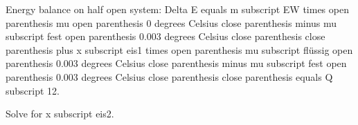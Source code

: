 Energy balance on half open system:  
Delta E equals m subscript EW times open parenthesis mu open parenthesis 0 degrees Celsius close parenthesis minus mu subscript fest open parenthesis 0.003 degrees Celsius close parenthesis close parenthesis plus x subscript eis1 times open parenthesis mu subscript flüssig open parenthesis 0.003 degrees Celsius close parenthesis minus mu subscript fest open parenthesis 0.003 degrees Celsius close parenthesis close parenthesis equals Q subscript 12.  

Solve for x subscript eis2.